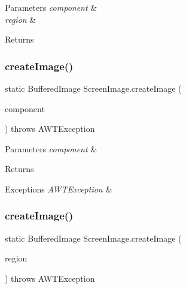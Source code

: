 \begin{DoxyParams}{Parameters}
{\em component} & \\
\hline
{\em region} & \\
\hline
\end{DoxyParams}
\begin{DoxyReturn}{Returns}

\end{DoxyReturn}
\mbox{\label{class_screen_image_ae3027318c36c5e08a76f721a9e5993f3}} 
\subsubsection{create\+Image()\hspace{0.1cm}{\footnotesize\ttfamily [3/4]}}
{\footnotesize\ttfamily static Buffered\+Image Screen\+Image.\+create\+Image (\begin{DoxyParamCaption}\item[{Component}]{component }\end{DoxyParamCaption}) throws A\+W\+T\+Exception\hspace{0.3cm}{\ttfamily [static]}}


\begin{DoxyParams}{Parameters}
{\em component} & \\
\hline
\end{DoxyParams}
\begin{DoxyReturn}{Returns}

\end{DoxyReturn}

\begin{DoxyExceptions}{Exceptions}
{\em A\+W\+T\+Exception} & \\
\hline
\end{DoxyExceptions}
\mbox{\label{class_screen_image_ae702af456800f1d99bf63cc7f5d48371}} 
\subsubsection{create\+Image()\hspace{0.1cm}{\footnotesize\ttfamily [4/4]}}
{\footnotesize\ttfamily static Buffered\+Image Screen\+Image.\+create\+Image (\begin{DoxyParamCaption}\item[{Rectangle}]{region }\end{DoxyParamCaption}) throws A\+W\+T\+Exception\hspace{0.3cm}{\ttfamily [static]}}

